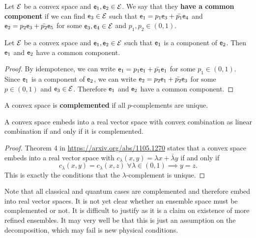 \begin{defn}
	Let $\mathcal{E}$ be a convex space and $\mathsf{e}_1, \mathsf{e}_2 \in \mathcal{E}$. We say that they \textbf{have a common component} if we can find $\mathsf{e}_3 \in \mathcal{E}$ such that $\mathsf{e}_1 = p_1 \mathsf{e}_3 + \bar{p_1} \mathsf{e}_4$ and $\mathsf{e}_2 = p_2 \mathsf{e}_3 + \bar{p_2} \mathsf{e}_5$ for some $\mathsf{e}_3, \mathsf{e}_4 \in \mathcal{E}$ and $p_1, p_2 \in (0,1)$.
\end{defn}

\begin{coro}
	Let $\mathcal{E}$ be a convex space and $\mathsf{e}_1, \mathsf{e}_2 \in \mathcal{E}$ such that $\mathsf{e}_1$ is a component of $\mathsf{e}_2$. Then $\mathsf{e}_1$ and $\mathsf{e}_2$ have a common component.
\end{coro}

\begin{proof}
	By idempotence, we can write $\mathsf{e}_1 = p_1 \mathsf{e}_1 + \bar{p_1} \mathsf{e}_1$ for some $p_1 \in (0,1)$. Since $\mathsf{e}_1$ is a component of $\mathsf{e}_2$, we can write $\mathsf{e}_2 = p_2 \mathsf{e}_1 + \bar{p_2} \mathsf{e}_3$ for some $p \in (0, 1)$ and $\mathsf{e}_3 \in \mathcal{E}$. Therefore $\mathsf{e}_1$ and $\mathsf{e}_2$ have a common component.
\end{proof}

\begin{defn}
	A convex space is \textbf{complemented} if all $p$-complements are unique.
\end{defn}

\begin{prop}
	A convex space embeds into a real vector space with convex combination as linear combination if and only if it is complemented.
\end{prop}
\begin{proof}
	Theorem 4 in \url{https://arxiv.org/abs/1105.1270} states that a convex space embeds into a real vector space with $c_\lambda(x,y) = \lambda x + \bar{\lambda}y$ if and only if
	$$ c_\lambda(x,y) = c_\lambda(x,z) \; \forall \lambda \in (0,1) \implies y = z.$$ This is exactly the conditions that the $\lambda$-complement is unique.	
\end{proof}

\begin{remark}
	Note that all classical and quantum cases are complemented and therefore embed into real vector spaces. It is not yet clear whether an ensemble space must be complemented or not. It is difficult to justify as it is a claim on existence of more refined ensembles. It may very well be that this is just an assumption on the decomposition, which may fail is new physical conditions.
\end{remark}


